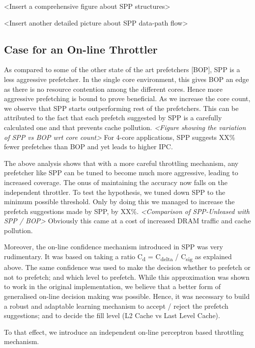 <Insert a comprehensive figure about SPP structures>

<Insert another detailed picture about SPP data-path flow>

\subsection{Case for an On-line Throttler}
\label{Background-Case}
As compared to some of the other state of the art prefetchers [BOP],
SPP is a less aggressive prefetcher.  In the single core
environment, this gives BOP an edge as there is no resource contention
among the different cores.  Hence more aggressive prefetching is bound
to prove beneficial.  As we increase the core count, we observe that
SPP starts outperforming rest of the prefetchers.  This can be
attributed to the fact that each prefetch suggested by SPP is a
carefully calculated one and that prevents cache pollution.
\textit{<Figure showing the variation of SPP vs BOP wrt core count>}
For 4-core applications, SPP suggests XX\% fewer prefetches than BOP
and yet leads to higher IPC.

The above analysis shows that with a more careful throttling
mechanism, any prefetcher like SPP can be tuned to become much more aggressive, leading to
increased coverage.  The onus of maintaining the accuracy now falls on
the independent throttler.  To test the hypothesis, we tuned down SPP
to the minimum possible threshold.  Only by doing this we managed to
increase the prefetch suggestions made by SPP, by XX\%.
\textit{<Comparison of SPP-Unleased with SPP / BOP>} Obviously this
came at a cost of increased DRAM traffic and cache pollution.

Moreover, the on-line confidence mechanism introduced in SPP was very
rudimentary.  It was based on taking a ratio C\textsubscript{d} =
C\textsubscript{delta} / C\textsubscript{sig} as explained above.  The
same confidence was used to make the decision whether to prefetch or
not to prefetch; and which level to prefetch.  While this
approximation was shown to work in the original implementation, we believe that a
better form of generalised on-line decision making was possible.  
Hence, it was
necessary to build a robust and adaptable learning mechanism to accept
/ reject the prefetch suggestions; and to decide the fill level (L2
Cache vs Last Level Cache).

To that effect, we introduce an independent on-line perceptron based throttling mechanism.
